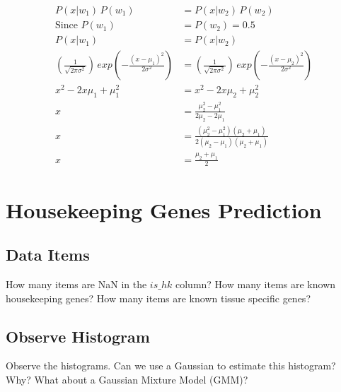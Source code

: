 \documentclass[12pt]{article}
\begin{document}

\begin{align*}
  P(x|w_1) \, P(w_1) &= P(x|w_2) \, P(w_2) \\
  \text{Since } P(w_1) &= P(w_2) = 0.5 \\
  P(x|w_1) &= P(x|w_2) \\
  (\frac{1}{\sqrt{2 \pi \sigma^2}}) \, exp (-\frac{(x-\mu_1)^2}{2 \sigma^2}) &= (\frac{1}{\sqrt{2 \pi \sigma^2}}) \, exp (-\frac{(x-\mu_2)^2}{2 \sigma^2}) \\
  x^2 - 2x\mu_1 + \mu_1^2 &= x^2 - 2x\mu_2 + \mu_2^2 \\
  x &= \frac{\mu_2^2 - \mu_1^2}{2\mu_2 - 2\mu_1} \\
  x &= \frac{(\mu_2^2 - \mu_1^2)(\mu_2 + \mu_1)}{2(\mu_2 - \mu_1)(\mu_2 + \mu_1)} \\
  x &= \frac{\mu_2 + \mu_1}{2}
\end{align*}


\section{Housekeeping Genes Prediction}

\subsection{Data Items}
How many items are NaN in the $is\_hk$ column? How many items are known
housekeeping genes? How many items are known tissue specific genes?
  \begin{figure}[H]
    \noindent{}
    \end{figure}
\subsection{Observe Histogram}
Observe the histograms. Can we use a Gaussian to estimate this histogram?
Why? What about a Gaussian Mixture Model (GMM)?
\end{document}
